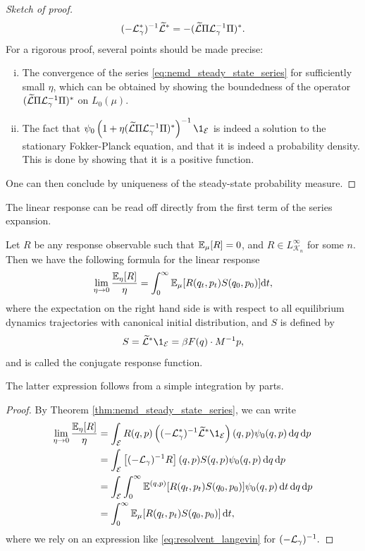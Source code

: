 \begin{proof}[Sketch of proof]
    \[(-\mathcal{L}_\gamma^*)^{-1}\widetilde{\mathcal{L}}^*=-(\widetilde{\mathcal{L}} \Pi \mathcal{L}_\gamma^{-1}\Pi)^*.\]
    For a rigorous proof, several points should be made precise:
    \begin{enumerate}[(i)]
        \item The convergence of the series \eqref{eq:nemd_steady_state_series} for sufficiently small $\eta$, which can be obtained by showing the boundedness of the operator $(\widetilde{\mathcal{L}} \Pi \mathcal{L}_\gamma^{-1}\Pi)^*$ on $L_0(\mu)$.
        \item The fact that $\psi_0\left(1+\eta(\widetilde{\cL} \Pi \cL_\gamma^{-1}\Pi)^*\right)^{-1}\1_{\mathcal E}$ is indeed a solution to the stationary Fokker-Planck equation, and that it is indeed a probability density. This is done by showing that it is a positive function.
    \end{enumerate}
    One can then conclude by uniqueness of the steady-state probability measure.
\end{proof}
The linear response can be read off directly from the first term of the series expansion.
\begin{corollary}
    Let $R$ be any response observable such that $\mathbb{E}_\mu[R]=0$, and $R\in L^{\infty}_{\mathcal{K}_n}$ for some $n$.
    Then we have the following formula for the linear response
    \begin{equation}
        \label{eq:green_kubo}
        \underset{\eta\to 0}{\lim}\,\frac{\mathbb{E}_{\eta}[R]}{\eta}=\int_0^\infty \mathbb{E}_\mu[R(q_t,p_t)S(q_0,p_0)]\mathrm{d} t,
    \end{equation}
    where the expectation on the right hand side is with respect to all equilibrium dynamics trajectories with canonical initial distribution, and $S$ is defined by
    \begin{equation}
        \label{eq:conjugate_response}
        S=\widetilde{\cL}^*\1_{\mathcal E}=\beta F(q)\cdot M^{-1}p,
    \end{equation}
    and is called the conjugate response function. 
\end{corollary}
The latter expression follows from a simple integration by parts.
\begin{proof}
    By Theorem \ref{thm:nemd_steady_state_series}, we can write 
    \begin{align*}
        \underset{\eta\to 0}{\lim}\,\frac{\E_{\eta}[R]}{\eta}&=\int_{\mathcal E}R(q,p)\left((-\cL_\gamma^*)^{-1}\widetilde{\cL}^*\1_{\mathcal E}\right)(q,p)\psi_0(q,p)\,\dif q\, \dif p\\
        &=\int_{\mathcal E}\left[(-\cL_\gamma)^{-1}R\right](q,p)S(q,p)\psi_0(q,p)\,\dif q\, \dif p\\
        &=\int_{\mathcal E}\int_0^\infty\E^{(q,p)}[R(q_t,p_t)S(q_0,p_0)]\psi_0(q,p)\,\dif t\,\dif q\,\dif p\\
        &=\int_0^\infty \E_\mu[R(q_t,p_t)S(q_0,p_0)]\,\dif t,
    \end{align*}
    where we rely on an expression like \eqref{eq:resolvent_langevin} for $(-\mathcal{L}_\gamma)^{-1}.$
\end{proof}
